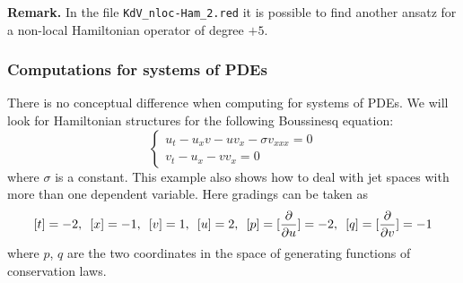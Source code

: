 \textbf{Remark.} In the file \texttt{KdV\_nloc-Ham\_2.red} it is possible to
find another ansatz for a non-local Hamiltonian operator of degree $+5$.

\subsubsection{Computations for systems of PDEs}
\label{sec:comp-syst-pdes}

There is no conceptual difference when computing for systems of PDEs. We will
look for Hamiltonian structures for the following Boussinesq equation:
\begin{equation}
  \label{cdiffeq:1}
  \left\{
  \begin{array}{l}
  u_t-u_xv-uv_x-\sigma v_{xxx}=0\\
  v_t-u_x-vv_x=0
\end{array}
\right.
\end{equation}
where $\sigma$ is a constant. This example also shows how to deal with jet
spaces with more than one dependent variable. Here gradings can be taken as
\[
  [t]=-2,\enskip [x]=-1,\enskip [v]=1,\enskip [u]=2,\enskip [p]=[\pd{}{u}]=-2,\enskip
  [q]=[\pd{}{v}]=-1
\]
where $p$, $q$ are the two coordinates in the space of generating functions of
conservation laws.

